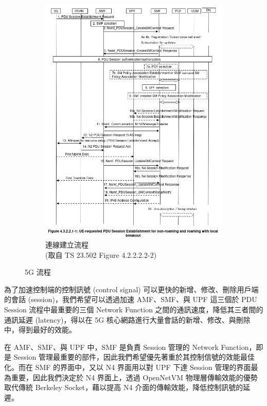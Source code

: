 \begin{figure}[htbp]
\begin{subfigure}[b]{.5\linewidth}
        \includegraphics[height=!,width=1\linewidth,keepaspectratio=true]{figures/23_502_4_3_2_2_1-1_sess_establish}
        \caption[連線建立流程]{{連線建立流程\\\scriptsize (取自 TS 23.502 Figure 4.2.2.2.2-2)}}
        \label{fig:sess_establish}
    \end{subfigure}
    \caption[5G 流程]{{\footnotesize 5G 流程~\cite{3gpp.23.502}}}
    \label{fig:5g_procedure}
\end{figure}


為了加速控制端的控制訊號 (control signal) 可以更快的新增、修改、刪除用戶端的會話 (session)，我們希望可以透過加速 AMF、SMF、與 UPF 這三個於 PDU Session 流程中最重要的三個 Network Function 之間的通訊速度，降低其三者間的通訊延遲 (latency)，得以在 5G 核心網路進行大量會話的新增、修改、與刪除中，得到最好的效能。

在 AMF、SMF、與 UPF 中，SMF 是負責 Session 管理的 Network Function，即是 Session 管理最重要的部件，因此我們希望優先著重於其控制信號的效能最佳化。而在 SMF 的界面中，又以 N4 界面用以對 UPF 下達 Session 管理的界面最為重要，因此我們決定於 N4 界面上，透過 OpenNetVM 物理層傳輸效能的優勢取代傳統 Berkeley Socket，藉以提高 N4 介面的傳輸效能，降低控制訊號的延遲。

